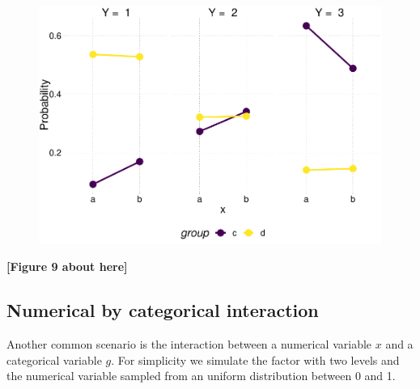 \documentclass[
  man,floatsintext]{apa6}
\begin{document}
\scriptsize

\begin{figure}

{\centering \includegraphics{paper_files/figure-latex/fig-effects-2-by-2-interaction-1} 

}

\caption{ }\label{fig:fig-effects-2-by-2-interaction}
\end{figure}

\begin{center}\textbf{[Figure 9 about here]} \end{center}

\normalsize

\subsection{Numerical by categorical interaction}\label{numerical-by-categorical-interaction}

Another common scenario is the interaction between a numerical variable \(x\) and a categorical variable \(g\). For simplicity we simulate the factor with two levels and the numerical variable sampled from an uniform distribution between 0 and 1.

\scriptsize
\end{document}
